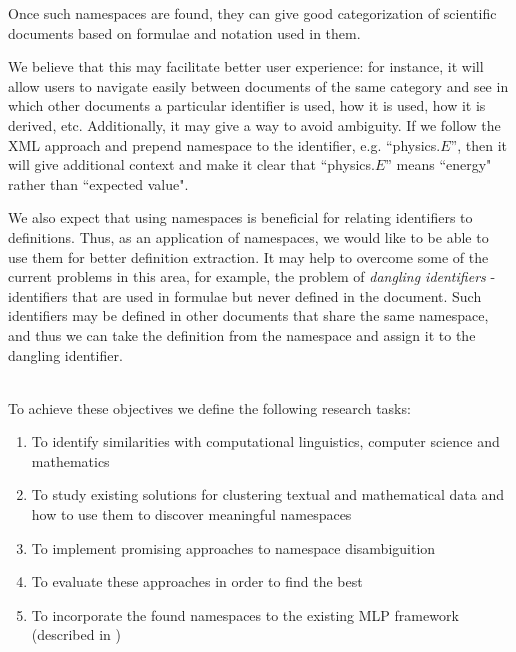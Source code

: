 
Once such namespaces are found, they can give good categorization of scientific documents based on formulae and notation used in them.


We believe that this may facilitate better user experience: for instance, it will allow users to navigate easily between documents of the same category and see in which other documents a particular identifier is used, how it is used, how it is derived, etc. Additionally, it may give a way to avoid ambiguity. If we follow the XML approach \cite{bray1999namespaces} and prepend namespace to the identifier, e.g. ``physics.$E$'', then it will give additional context and make it clear that ``physics.$E$'' means ``energy" rather than ``expected value".

We also expect that using namespaces is beneficial for relating identifiers to definitions. Thus, as an application of namespaces, we would like to be able to use them for better definition extraction. It may help to overcome some of the current problems in this area, for example, the problem of \emph{dangling identifiers} \cite{pagael2014mlp} - identifiers that are used in formulae but never defined in the document. Such identifiers may be defined in other documents that share the same namespace, and thus we can take the definition from the namespace and assign it to the dangling identifier.



\ \\

To achieve these objectives we define the following research tasks:

\begin{enumerate}
\itemsep1pt\parskip0pt

  \item To identify similarities with computational linguistics, computer science and mathematics
  \item To study existing solutions for clustering textual and mathematical data and how to use them to discover meaningful namespaces
  \item To implement promising approaches to namespace disambiguition
  \item To evaluate these approaches in order to find the best
  \item To incorporate the found namespaces to the existing MLP framework (described in \cite{source:mlpp})
\end{enumerate}

